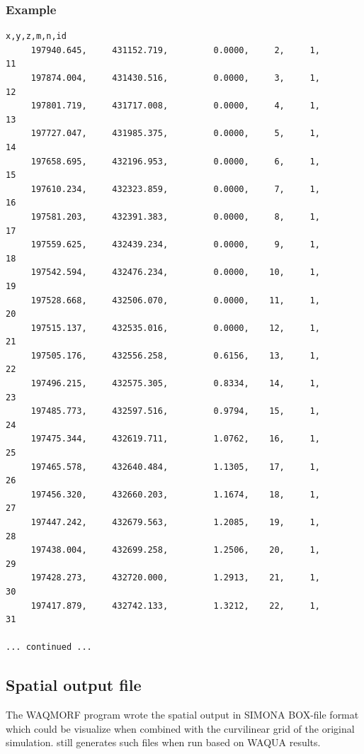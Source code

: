 \subsubsection*{Example}

\begin{Verbatim}
x,y,z,m,n,id
     197940.645,     431152.719,         0.0000,     2,     1,        11
     197874.004,     431430.516,         0.0000,     3,     1,        12
     197801.719,     431717.008,         0.0000,     4,     1,        13
     197727.047,     431985.375,         0.0000,     5,     1,        14
     197658.695,     432196.953,         0.0000,     6,     1,        15
     197610.234,     432323.859,         0.0000,     7,     1,        16
     197581.203,     432391.383,         0.0000,     8,     1,        17
     197559.625,     432439.234,         0.0000,     9,     1,        18
     197542.594,     432476.234,         0.0000,    10,     1,        19
     197528.668,     432506.070,         0.0000,    11,     1,        20
     197515.137,     432535.016,         0.0000,    12,     1,        21
     197505.176,     432556.258,         0.6156,    13,     1,        22
     197496.215,     432575.305,         0.8334,    14,     1,        23
     197485.773,     432597.516,         0.9794,    15,     1,        24
     197475.344,     432619.711,         1.0762,    16,     1,        25
     197465.578,     432640.484,         1.1305,    17,     1,        26
     197456.320,     432660.203,         1.1674,    18,     1,        27
     197447.242,     432679.563,         1.2085,    19,     1,        28
     197438.004,     432699.258,         1.2506,    20,     1,        29
     197428.273,     432720.000,         1.2913,    21,     1,        30
     197417.879,     432742.133,         1.3212,    22,     1,        31 

... continued ...
\end{Verbatim}


\subsection{Spatial output file}

The WAQMORF program wrote the spatial output in SIMONA BOX-file format which could be visualize when combined with the curvilinear grid of the original simulation.
\dfastmi still generates such files when run based on WAQUA results.
